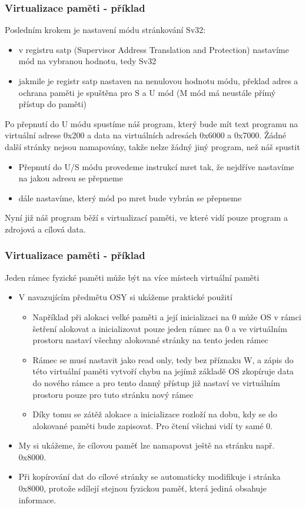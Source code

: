 \documentclass{beamer}
\begin{document}
\begin{frame}
\frametitle{Virtualizace paměti - příklad}

Posledním krokem je nastavení módu stránkování Sv32:
\begin{itemize}
\item v registru satp (Supervisor Address Translation and Protection) nastavíme mód na vybranou hodnotu, tedy Sv32
\item jakmile je registr satp nastaven na nenulovou hodnotu módu, překlad adres a ochrana paměti je spuštěna pro S a U mód (M mód má neustále přímý přístup do paměti)
\end{itemize}

Po přepnutí do U módu spustíme náš program, který bude mít text programu na virtuální adrese 0x200 a data na virtuálních adresách 0x6000 a 0x7000. Žádné další stránky nejsou namapovány, takže nelze žádný jiný program, než náš spustit
\begin{itemize}
\item Přepnutí do U/S módu provedeme instrukcí mret tak, že nejdříve nastavíme na jakou adresu se přepneme
\item dále nastavíme, který mód po mret bude vybrán se přepneme
\end{itemize}

Nyní již náš program běží s virtualizací paměti, ve které vidí pouze program a zdrojová a cílová data.
\end{frame}



\begin{frame}
\frametitle{Virtualizace paměti - příklad}

Jeden rámec fyzické paměti může být na více místech virtuální paměti
\begin{itemize}
\item V navazujícím předmětu OSY si ukážeme praktické použití
\begin{itemize}
\item Například při alokaci velké paměti a její inicializaci na 0 může OS v rámci šetření alokovat a inicializovat pouze jeden rámec na 0 a ve virtuálním prostoru nastaví všechny alokované stránky na tento jeden rámec
\item Rámec se musí nastavit jako read only, tedy bez příznaku W, a zápis do této virtuální paměti vytvoří chybu na jejímž základě OS zkopíruje data do nového rámce a pro tento danný přístup již nastaví ve virtuálním prostoru pouze pro tuto stránku nový rámec
\item Díky tomu se zátěž alokace a inicializace rozloží na dobu, kdy se do alokované paměti bude zapisovat. Pro čtení všichni vidí ty samé 0.
\end{itemize}
\item My si ukážeme, že cílovou paměť lze namapovat ještě na stránku např. 0x8000.
\item Při kopírování dat do cílové stránky se automaticky modifikuje i stránka 0x8000, protože sdílejí stejnou fyzickou paměť, která jediná obsahuje informace.
\end{itemize}

\end{frame}
\end{document}
